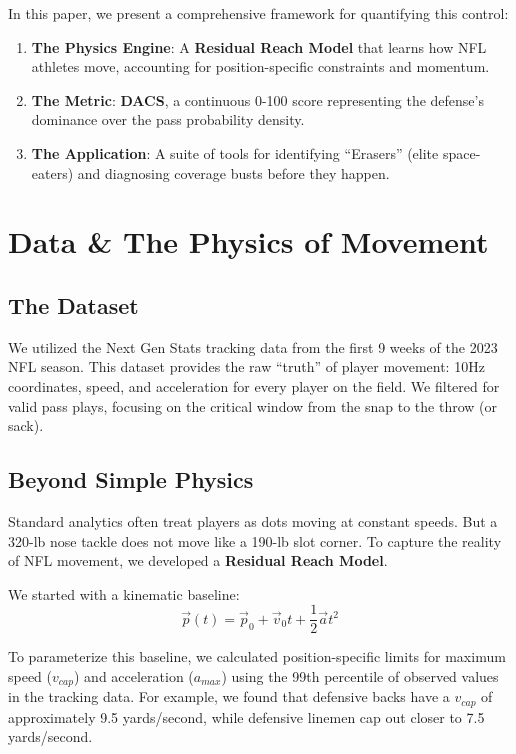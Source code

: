 \documentclass{article}
\begin{document}
In this paper, we present a comprehensive framework for quantifying this control:
\begin{enumerate}
    \item \textbf{The Physics Engine}: A \textbf{Residual Reach Model} that learns how NFL athletes move, accounting for position-specific constraints and momentum.
    \item \textbf{The Metric}: \textbf{DACS}, a continuous 0-100 score representing the defense's dominance over the pass probability density.
    \item \textbf{The Application}: A suite of tools for identifying ``Erasers'' (elite space-eaters) and diagnosing coverage busts before they happen.
\end{enumerate}

\section{Data \& The Physics of Movement}

\subsection{The Dataset}
We utilized the Next Gen Stats tracking data from the first 9 weeks of the 2023 NFL season. This dataset provides the raw ``truth'' of player movement: 10Hz coordinates, speed, and acceleration for every player on the field. We filtered for valid pass plays, focusing on the critical window from the snap to the throw (or sack).

\subsection{Beyond Simple Physics}
Standard analytics often treat players as dots moving at constant speeds. But a 320-lb nose tackle does not move like a 190-lb slot corner. To capture the reality of NFL movement, we developed a \textbf{Residual Reach Model}.

We started with a kinematic baseline:
\[ \vec{p}(t) = \vec{p}_0 + \vec{v}_0 t + \frac{1}{2} \vec{a} t^2 \]

To parameterize this baseline, we calculated position-specific limits for maximum speed ($v_{cap}$) and acceleration ($a_{max}$) using the 99th percentile of observed values in the tracking data. For example, we found that defensive backs have a $v_{cap}$ of approximately 9.5 yards/second, while defensive linemen cap out closer to 7.5 yards/second.
\end{document}
